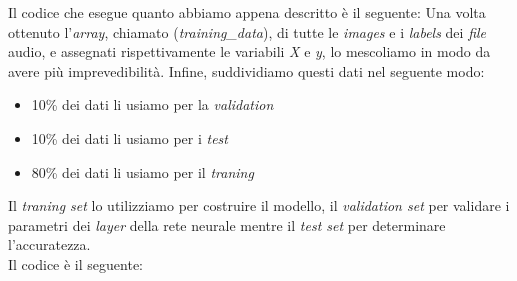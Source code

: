 \noindent Il codice che esegue quanto abbiamo appena descritto è il seguente:
\vspace*{2ex}
\vspace*{2ex}
Una volta ottenuto l'\textit{array}, chiamato (\textit{training\_data}), di tutte le \textit{images} e i \textit{labels} dei \textit{file} audio, e assegnati rispettivamente le variabili \textit{X} e \textit{y}, lo mescoliamo in modo da avere più imprevedibilità. Infine, suddividiamo questi dati nel seguente modo:
\begin{itemize}
	\item 10\% dei dati li usiamo per la \textit{validation}
	\item 10\% dei dati li usiamo per i \textit{test}
	\item 80\% dei dati li usiamo per il \textit{traning}
\end{itemize}
Il \textit{traning set} lo utilizziamo per costruire il modello, il \textit{validation set} per validare i parametri dei \textit{layer} della rete neurale mentre il \textit{test set} per determinare l'accuratezza.\\
\newline
Il codice è il seguente:
\vspace*{2ex}
\vspace*{2ex}
